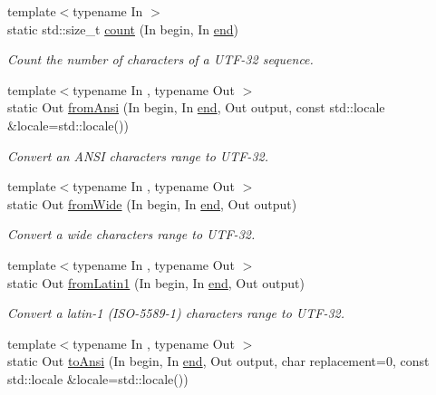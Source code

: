 \begin{DoxyCompactItemize}
{\footnotesize template$<$typename In $>$ }\\static std\-::size\-\_\-t \hyperlink{classsf_1_1_utf_3_0132_01_4_a9b18c32b9e6d4b3126e9b4af45988b55}{count} (In begin, In \hyperlink{gl3_8h_a432111147038972f06e049e18a837002}{end})
\begin{DoxyCompactList}\small\item\em Count the number of characters of a U\-T\-F-\/32 sequence. \end{DoxyCompactList}\item 
{\footnotesize template$<$typename In , typename Out $>$ }\\static Out \hyperlink{classsf_1_1_utf_3_0132_01_4_a384a4169287af15876783ad477cac4e3}{from\-Ansi} (In begin, In \hyperlink{gl3_8h_a432111147038972f06e049e18a837002}{end}, Out output, const std\-::locale \&locale=std\-::locale())
\begin{DoxyCompactList}\small\item\em Convert an A\-N\-S\-I characters range to U\-T\-F-\/32. \end{DoxyCompactList}\item 
{\footnotesize template$<$typename In , typename Out $>$ }\\static Out \hyperlink{classsf_1_1_utf_3_0132_01_4_abdf0d41e0c8814a68326688e3b8d187f}{from\-Wide} (In begin, In \hyperlink{gl3_8h_a432111147038972f06e049e18a837002}{end}, Out output)
\begin{DoxyCompactList}\small\item\em Convert a wide characters range to U\-T\-F-\/32. \end{DoxyCompactList}\item 
{\footnotesize template$<$typename In , typename Out $>$ }\\static Out \hyperlink{classsf_1_1_utf_3_0132_01_4_a05741b76b5a26267a72735e40ca61c55}{from\-Latin1} (In begin, In \hyperlink{gl3_8h_a432111147038972f06e049e18a837002}{end}, Out output)
\begin{DoxyCompactList}\small\item\em Convert a latin-\/1 (I\-S\-O-\/5589-\/1) characters range to U\-T\-F-\/32. \end{DoxyCompactList}\item 
{\footnotesize template$<$typename In , typename Out $>$ }\\static Out \hyperlink{classsf_1_1_utf_3_0132_01_4_a768cb205f7f1d20cd900e34fb48f9316}{to\-Ansi} (In begin, In \hyperlink{gl3_8h_a432111147038972f06e049e18a837002}{end}, Out output, char replacement=0, const std\-::locale \&locale=std\-::locale())

\end{DoxyCompactItemize}
